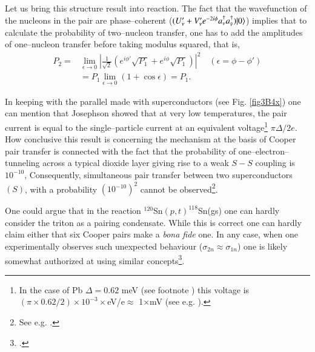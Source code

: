 \begin{subappendices}
 
 Let us bring this structure result into reaction. The fact that the wavefunction of the nucleons in the pair are phase--coherent ($(U'_\nu+V'_\nu e^{-2i\phi} a_\nu^\dagger a_{\bar{\nu}}^\dagger)|{0} \rangle$) implies that to calculate the probability of two--nucleon transfer, one has to add the amplitudes of one--nucleon transfer before taking modulus squared, that is,
 \begin{align}\label{eq3B13}
\nonumber P_2=&\lim_{\epsilon\rightarrow 0}\left|\frac{1}{\sqrt{2}}\left(e^{i\phi'}\sqrt{P_1}+e^{i\phi}\sqrt{P_1}\right)\right|^2\quad(\epsilon=\phi-\phi')\\
&=P_1\lim_{\epsilon\rightarrow0}(1+\cos \epsilon)=P_1.
 \end{align}  


In keeping with the parallel made with superconductors (see Fig. \ref{fig3B4x}) one can mention that Josephson showed that at very low temperatures, the pair current is equal to the single--particle current at an equivalent voltage\footnote{In the case of Pb $\Delta=0.62$ meV (see footnote \footnotemark[\ref{foot75}]) this voltage is $(\pi\times0.62/2)\times 10^{-3}\times$eV/e$\approx$ 1$\times$mV (see e.g. \cite{McDonald:01}).} $\pi\Delta/2e$. How conclusive this result is concerning the mechanism at the basis of Cooper pair transfer is connected with the fact that the probability of one--electron--tunneling across a typical dioxide layer giving rise to a weak $S-S$ coupling is $10^{-10}$, Consequently, simultaneous pair transfer between two superconductors $(S)$, with a probability  $(10^{-10})^2$ cannot be observed\footnote{See e.g. \cite{McDonald:01}.}.


One could argue that in the reaction $^{120}$Sn$(p,t)^{118}$Sn(gs) one can hardly consider the triton as a pairing condensate. While this is correct one can hardly claim either that six Cooper pairs make a \textit{bona fide} one. In any case, when one experimentally observes such unexpected behaviour ($\sigma_{2n}\approx\sigma_{1n}$) one is likely somewhat authorized at using similar concepts\footnote{\cite{Anderson:72}.}.

\end{subappendices}
